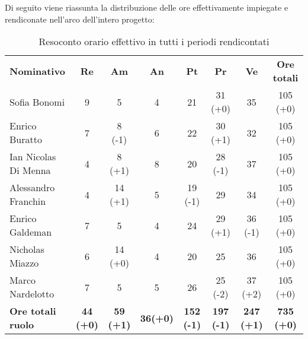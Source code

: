 \documentclass[../piano-di-progetto.tex]{subfiles}
\begin{document}
  Di seguito viene riassunta la distribuzione delle ore effettivamente impiegate e rendiconate nell'arco dell'intero progetto:
  \begin{table}[H]
    \centering
    \begin{tabular}{lccccccc}
      \rowcolor{lightgray}
      \textbf{Nominativo}       & \textbf{Re}      & \textbf{Am} & \textbf{An}      & \textbf{Pt} & \textbf{Pr} & \textbf{Ve} & \textbf{Ore totali} \\
Sofia Bonomi              & 9                & 5                & 4               & 21                & 31 (+0)           & 35                & 105 (+0)          \\
Enrico Buratto            & 7                & 8 (-1)           & 6               & 22                & 30 (+1)           & 32                & 105 (+0)          \\
Ian Nicolas Di Menna      & 4                & 8 (+1)           & 8               & 20                & 28 (-1)           & 37                & 105 (+0)          \\
Alessandro Franchin       & 4                & 14 (+1)          & 5               & 19 (-1)           & 29                & 34                & 105 (+0)          \\
Enrico Galdeman           & 7                & 5                & 4               & 24                & 29 (+1)           & 36 (-1)           & 105 (+0)          \\
Nicholas Miazzo           & 6                & 14 (+0)          & 4               & 20                & 25                & 36                & 105 (+0)          \\
Marco Nardelotto          & 7                & 5                & 5               & 26                & 25 (-2)           & 37 (+2)           & 105 (+0)          \\
\textbf{Ore totali ruolo} & \textbf{44 (+0)} & \textbf{59 (+1)} & \textbf{36(+0)} & \textbf{152 (-1)} & \textbf{197 (-1)} & \textbf{247 (+1)} & \textbf{735 (+0)}
    \end{tabular}
    \caption{Resoconto orario effettivo in tutti i periodi rendicontati}
  \end{table}
  
\end{document}
